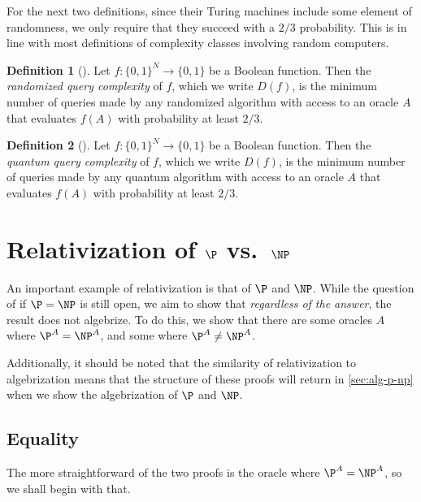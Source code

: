 \documentclass[english]{reedthesis}
\theoremstyle{plain}
\theoremstyle{definition}
\newtheorem{defn}[defn]{Definition}
\theoremstyle{remark}
\begin{document}
For the next two definitions, since their Turing machines include some element
of randomness, we only require that they succeed with a $2/3$ probability. This
is in line with most definitions of complexity classes involving random
computers.

\begin{defn}[{\cite[17]{AW09}}]\label{def:rand-qc}
  Let $f: \{0, 1\}^{N} \rightarrow \{0, 1\}$ be a Boolean function. Then the
  \emph{randomized query complexity} of $f$, which we write $D(f)$, is the
  minimum number of queries made by any randomized algorithm with access to an
  oracle $A$ that evaluates $f(A)$ with probability at least $2/3$.
\end{defn}


\begin{defn}[{\cite[17]{AW09}}]\label{def:quant-qc}
  Let $f: \{0, 1\}^{N} \rightarrow \{0, 1\}$ be a Boolean function. Then the
  \emph{quantum query complexity} of $f$, which we write $D(f)$, is the
  minimum number of queries made by any quantum algorithm with access to an
  oracle $A$ that evaluates $f(A)$ with probability at least $2/3$.
\end{defn}

\section{Relativization of $\P$ vs.\ $\NP$}\label{sec:rel-p-np}

An important example of relativization is that of $\P$ and $\NP$. While the
question of if $\P = \NP$ is still open, we aim to show that \emph{regardless of
the answer}, the result does not algebrize. To do this, we show that there are
some oracles $A$ where $\P^{A} = \NP^{A}$, and some where $\P^{A} \ne \NP^{A}$.

Additionally, it should be noted that the similarity of relativization to
algebrization means that the structure of these proofs will return in
\cref{sec:alg-p-np} when we show the algebrization of $\P$ and $\NP$.

\subsection{Equality}

The more straightforward of the two proofs is the oracle where
$\P^{A} = \NP^{A}$, so we shall begin with that.
\end{document}
